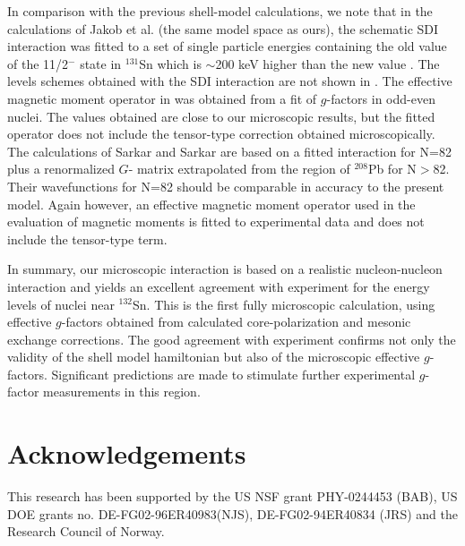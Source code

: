 \documentclass[aps,twocolumn,superscriptaddress,prc,showpacs]{revtex4}
\begin{document}
In comparison with the previous shell-model calculations,
we note that in the calculations of Jakob et al. \cite{jak02} (the same model space as ours),
the schematic SDI interaction was fitted to a set of single particle energies
containing the old value of the 11/2$^-$ state in $^{131}$Sn which is $\sim$200 keV
higher than the new value \cite{fogel}. The levels schemes obtained with the SDI interaction
are not shown in \cite{jak02}. The effective magnetic moment operator in \cite{jak02}
was obtained from a fit of $g$-factors in odd-even nuclei.
The values obtained are close to our microscopic results, but the fitted operator does
not include the tensor-type correction obtained microscopically. The calculations
of Sarkar and Sarkar \cite{sar01} are 
based on a fitted interaction for N=82 plus a
renormalized $ G $- matrix extrapolated from the region of $^{208}$Pb for N$>$82. Their wavefunctions
for N=82 
should be comparable in accuracy to the present model. Again however, 
an effective magnetic moment
operator used in the 
evaluation of magnetic moments is fitted to
experimental data and does not include the tensor-type term.

In summary, our microscopic interaction is based on a realistic nucleon-nucleon
interaction and yields an excellent agreement with experiment for the energy levels
of nuclei near $^{132}$Sn. This is the first fully microscopic calculation,
using effective $g$-factors obtained from calculated core-polarization and mesonic exchange corrections.
The good agreement with experiment confirms not only the validity of the shell
model hamiltonian but also of the microscopic effective $g$-factors.
Significant predictions are made to stimulate 
further experimental $g$-factor
measurements in this region.

\section{Acknowledgements}
This research has been supported by the US NSF grant PHY-0244453 (BAB),
US DOE grants no. DE-FG02-96ER40983(NJS), DE-FG02-94ER40834 (JRS) and the Research Council of Norway.
\end{document}
